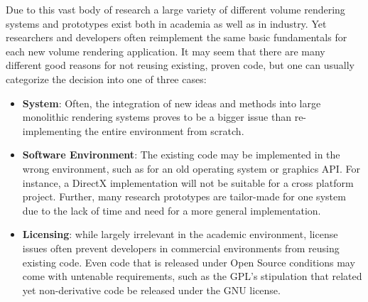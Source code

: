 Due to this vast body of research a large variety of different volume
rendering systems and prototypes exist both in academia as well as
in industry. Yet researchers and developers often reimplement the
same basic fundamentals for each new volume rendering application. It
may seem that there are many different good reasons for not reusing
existing, proven code, but one can usually categorize the decision into
one of three cases:

\begin{itemize}

  \item \textbf{System}:
	Often, the integration of new ideas and methods
	into large monolithic rendering systems proves to be a
	bigger issue than re-implementing the entire environment
	from scratch.

  \item \textbf{Software Environment}: The existing code may be
  implemented in the wrong environment, such as for an old operating
  system or graphics API. For instance, a DirectX implementation will
  not be suitable for a cross platform project. Further, many research
  prototypes are tailor-made for one system due to the lack of time and
  need for a more general implementation.

  \item \textbf{Licensing}: while largely irrelevant in the academic
  environment, license issues often prevent developers in commercial
  environments from reusing existing code. Even code that is released
  under Open Source conditions may come with untenable requirements,
  such as the GPL's stipulation that related yet non-derivative code be
  released under the GNU license.

\end{itemize}

